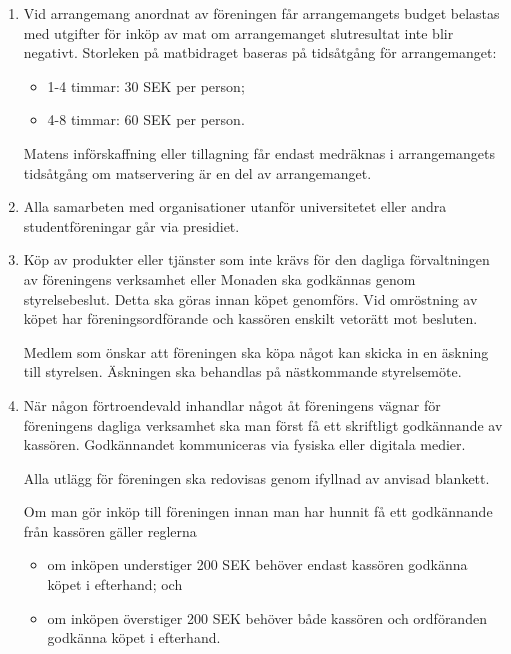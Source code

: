 \documentclass{dvd}
\begin{document}
\begin{enumerate}[label=\arabic* §, ref=\arabic*]
	\item Vid arrangemang anordnat av föreningen får arrangemangets budget belastas med utgifter för inköp av mat om arrangemanget slutresultat inte blir negativt.
	      Storleken på matbidraget baseras på tidsåtgång för arrangemanget:

	      \begin{itemize}
		      \item 1-4 timmar: 30 SEK per person;

		      \item 4-8 timmar: 60 SEK per person.
	      \end{itemize}

	      Matens införskaffning eller tillagning får endast medräknas i arrangemangets tidsåtgång om matservering är en del av arrangemanget.

	\item Alla samarbeten med organisationer utanför universitetet eller andra studentföreningar går via presidiet.

	\item Köp av produkter eller tjänster som inte krävs för den dagliga förvaltningen av föreningens verksamhet eller Monaden ska godkännas genom styrelsebeslut.
	      Detta ska göras innan köpet genomförs.
	      Vid omröstning av köpet har föreningsordförande och kassören enskilt vetorätt mot besluten.

	      Medlem som önskar att föreningen ska köpa något kan skicka in en äskning till styrelsen.
	      Äskningen ska behandlas på nästkommande styrelsemöte.

	\item När någon förtroendevald inhandlar något åt föreningens vägnar för föreningens dagliga verksamhet ska man först få ett skriftligt godkännande av kassören.
	      Godkännandet kommuniceras via fysiska eller digitala medier.

	      Alla utlägg för föreningen ska redovisas genom ifyllnad av anvisad blankett.

	      Om man gör inköp till föreningen innan man har hunnit få ett godkännande från kassören gäller reglerna

	      \begin{itemize}
		      \item om inköpen understiger 200 SEK behöver endast kassören godkänna köpet i efterhand; och

		      \item om inköpen överstiger 200 SEK behöver både kassören och ordföranden godkänna köpet i efterhand.
	      \end{itemize}
\end{enumerate}
\end{document}
